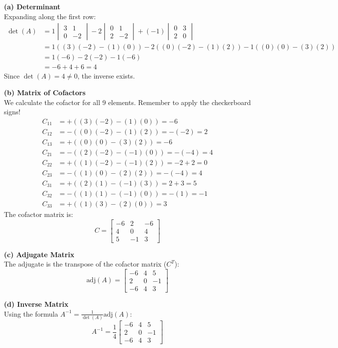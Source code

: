 \begin{solution}
\textbf{(a) Determinant} \\
Expanding along the first row:
\begin{align*}
\det(A) &= 1 \begin{vmatrix} 3 & 1 \\ 0 & -2 \end{vmatrix} - 2 \begin{vmatrix} 0 & 1 \\ 2 & -2 \end{vmatrix} + (-1) \begin{vmatrix} 0 & 3 \\ 2 & 0 \end{vmatrix} \\[6pt]
&= 1( (3)(-2) - (1)(0) ) - 2( (0)(-2) - (1)(2) ) - 1( (0)(0) - (3)(2) ) \\
&= 1( -6 ) - 2( -2 ) - 1( -6 ) \\
&= -6 + 4 + 6 = 4
\end{align*}
Since $\det(A) = 4 \neq 0$, the inverse exists.

\medskip
\textbf{(b) Matrix of Cofactors} \\
We calculate the cofactor for all 9 elements. Remember to apply the checkerboard signs!
\begin{align*}
C_{11} &= +( (3)(-2) - (1)(0) ) = -6 \\
C_{12} &= -( (0)(-2) - (1)(2) ) = -(-2) = 2 \\
C_{13} &= +( (0)(0) - (3)(2) ) = -6 \\[6pt]
C_{21} &= -( (2)(-2) - (-1)(0) ) = -(-4) = 4 \\
C_{22} &= +( (1)(-2) - (-1)(2) ) = -2 + 2 = 0 \\
C_{23} &= -( (1)(0) - (2)(2) ) = -(-4) = 4 \\[6pt]
C_{31} &= +( (2)(1) - (-1)(3) ) = 2 + 3 = 5 \\
C_{32} &= -( (1)(1) - (-1)(0) ) = -(1) = -1 \\
C_{33} &= +( (1)(3) - (2)(0) ) = 3
\end{align*}
The cofactor matrix is:
\[
C = \begin{bmatrix} -6 & 2 & -6 \\ 4 & 0 & 4 \\ 5 & -1 & 3 \end{bmatrix}
\]

\medskip
\textbf{(c) Adjugate Matrix} \\
The adjugate is the transpose of the cofactor matrix ($C^T$):
\[
\text{adj}(A) = \begin{bmatrix} -6 & 4 & 5 \\ 2 & 0 & -1 \\ -6 & 4 & 3 \end{bmatrix}
\]

\medskip
\textbf{(d) Inverse Matrix} \\
Using the formula $A^{-1} = \frac{1}{\det(A)}\text{adj}(A)$:
\[
A^{-1} = \frac{1}{4} \begin{bmatrix} -6 & 4 & 5 \\ 2 & 0 & -1 \\ -6 & 4 & 3 \end{bmatrix}
\]
\end{solution}

